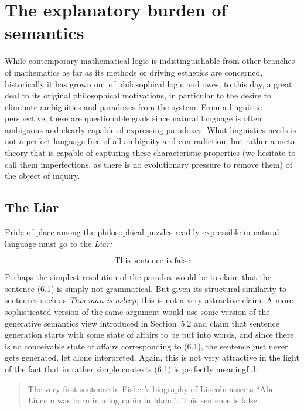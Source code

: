 \section{The explanatory burden of semantics}

While contemporary mathematical logic is indistinguishable from other branches
of mathematics as far as its methods or driving esthetics are concerned,
historically it has grown out of philosophical logic and owes, to this day, a
great deal to its original philosophical motivations, in particular to the
desire to eliminate ambiguities and paradoxes from the system. From a
linguistic perspective, these are questionable goals since natural
language is often ambiguous and clearly capable of expressing paradoxes.
What linguistics needs is not a perfect language free of all ambiguity and
contradiction, but rather a meta-theory that is capable of capturing these
characteristic properties (we hesitate to call them imperfections, as there is
no evolutionary pressure to remove them) of the object of inquiry. 

\subsection{The Liar}

Pride of place among the philosophical puzzles readily expressible in 
natural language must go to the {\it Liar:} 

\begin{equation}
\mbox{This sentence is false}
\end{equation}

\noindent
Perhaps the simplest resolution of the paradox would be to claim that the
sentence (6.1) is simply not grammatical. But given its structural similarity
to sentences such as {\it This man is asleep}, this is not a very attractive
claim. A more sophisticated version of the same argument would use some
version of the generative semantics view introduced in Section~5.2 and claim
that sentence generation starts with some state of affairs to be put into
words, and since there is no conceivable state of affairs corresponding to
(6.1), the sentence just never gets generated, let alone interpreted. Again,
this is not very attractive in the light of the fact that in rather simple
contexts (6.1) is perfectly meaningful:

\begin{quote}

The very first sentence in Fisher's biography of Lincoln asserts ``Abe Lincoln
was born in a log cabin in Idaho". This sentence is false. 

\end{quote}

